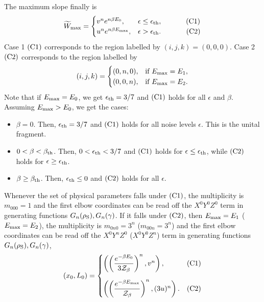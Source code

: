 \documentclass[pra,
aps,
twocolumn,
superscriptaddress,
groupedaddress,
nofootinbib,
reprint
]{revtex4-1}
\begin{document}
The maximum slope finally is
\begin{equation}
\widetilde{W}_{\rm{max}} =
	\begin{cases}
		\wn^n e^{n\beta E_0}, &\epsilon \leq \epsilon_{\rm{th}},\ \hspace{30pt}\rm{(C1)}	\\
		\wp^n e^{n\beta E_{\rm{max}}}, &\epsilon > \epsilon_{\rm{th}}.\ \hspace{32pt}\rm{(C2)} 
	\end{cases}
\end{equation}
Case 1 $\rm{(C1)}$ corresponds to the region labelled by $(i,j,k) = (0,0,0)$.
Case 2 $\rm{(C2)}$ corresponds to the region labelled by 
\begin{equation}
	(i,j,k) = 
	\begin{cases}
	(0,n,0), &\text{if } E_{\rm{max}} = E_1, \\
	(0,0,n), &\text{if } E_{\rm{max}} = E_2.
	\end{cases}
\end{equation}
Note that if $E_{\rm{max}} = E_0$, we get $\epsilon_{\rm{th}} = 3/7$ and $\rm{(C1)}$ holds for all $\epsilon$ and $\beta$.
Assuming $E_{\rm{max}} > E_0$, we get the cases:
\begin{itemize}
	\item $\beta = 0$. Then, $\epsilon_{\rm{th}} = 3/7$ and $\rm{(C1)}$ holds for all noise levels $\epsilon$.
	This is the unital fragment.
	\item $0 < \beta < \beta_{\rm{th}}$. Then, $0 < \epsilon_{\rm{th}} < 3/7$ and $\rm{(C1)}$ holds for $\epsilon \leq \epsilon_{\rm{th}}$, while $\rm{(C2)}$ holds for $\epsilon \geq \epsilon_{\rm{th}}$.
	\item $\beta \geq \beta_{\rm{th}}$. Then, $ \epsilon_{\rm{th}} \leq 0$ and $\rm{(C2)}$ holds for all $\epsilon$.
\end{itemize}

Whenever the set of physical parameters falls under $\rm{(C1)}$, the multiplicity is $m_{000} = 1$ and the first elbow coordinates can be read off the $X^0Y^0Z^0$ term in generating functions $G_n(\rho_{\rm{S}}), G_n(\gamma)$.
If it falls under $\rm{(C2)}$, then $E_{\rm{max}} = E_1$ ($E_{\rm{max}} = E_2$), the multiplicity is $m_{0n0} = 3^n$ ($m_{00n} = 3^n$) and the first elbow coordinates can be read off the $X^0Y^nZ^0$ ($X^0Y^0Z^n$) term in generating functions $G_n(\rho_{\rm{S}}), G_n(\gamma)$,
\begin{equation}
	(x_0, L_0) =
	\begin{cases}
		\left( \left(\dfrac{e^{-\beta E_0}}{3\Z_\beta}\right)^n, \wn^n \right), &\rm{(C1)}	\vspace{10pt}\\
		\left( \left(\dfrac{e^{-\beta E_{\rm{max}}}}{\Z_\beta}\right)^n, (3u)^n \right). &\rm{(C2)} 
	\end{cases}
\end{equation}
\end{document}
